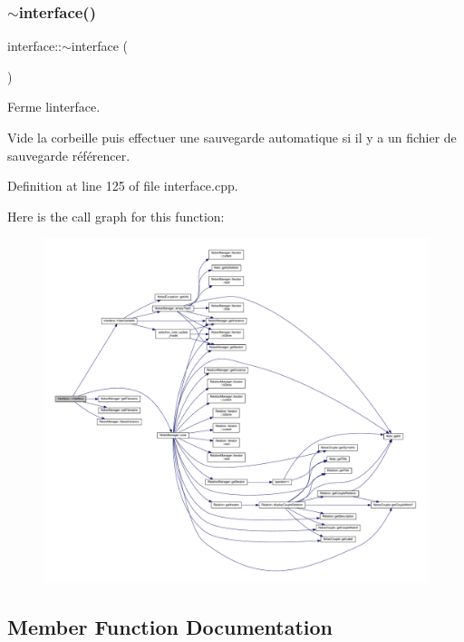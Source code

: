 \subsubsection{\texorpdfstring{$\sim$interface()}{~interface()}}
{\footnotesize\ttfamily interface\+::$\sim$interface (\begin{DoxyParamCaption}{ }\end{DoxyParamCaption})}



Ferme l\textquotesingle{}interface. 

Vide la corbeille puis effectuer une sauvegarde automatique si il y a un fichier de sauvegarde référencer. 

Definition at line 125 of file interface.\+cpp.

Here is the call graph for this function\+:\nopagebreak
\begin{figure}[H]
\begin{center}
\leavevmode
\includegraphics[width=350pt]{classinterface_a8511f28c5bc5d3c24a24e9aaef4db502_cgraph}
\end{center}
\end{figure}


\subsection{Member Function Documentation}
\mbox{\label{classinterface_a287c8a46ece12a94540a190b96b911c9}} 
